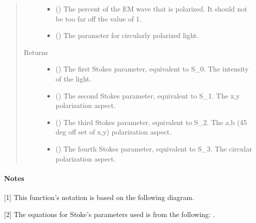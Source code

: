 \documentclass[letterpaper,10pt,english]{sphinxmanual}
\begin{document}
\begin{fulllineitems}
\begin{quote}
\begin{description}
\begin{itemize}
\item {} 
 () \textendash{} The percent of the EM wave that is polarized. It should not be too
far off the value of 1.

\item {} 
 () \textendash{} The parameter for circularly polarized light.

\end{itemize}

\item[{Returns}] \leavevmode
\begin{itemize}
\item {} 
 () \textendash{} The first Stokes parameter, equivalent to S\_0. The intensity of the
light.

\item {} 
 () \textendash{} The second Stokes parameter, equivalent to S\_1. The x,y polarization
aspect.

\item {} 
 () \textendash{} The third Stokes parameter, equivalent to S\_2. The a,b (45 deg off set
of x,y) polarization aspect.

\item {} 
 () \textendash{} The fourth Stokes parameter, equivalent to S\_3. The circular
polarization aspect.

\end{itemize}


\end{description}\end{quote}
\paragraph{Notes}

{[}1{]}  This function’s notation is based on the following diagram.

{[}2{]} The equations for Stoke’s parameters used is from the following: .

\end{fulllineitems}
\end{document}
